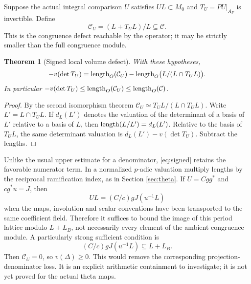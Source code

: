 \documentclass[11pt,a4paper]{article}
\newtheorem{theorem}{Theorem}[section]\newtheorem{proposition}[theorem]{Proposition}\newtheorem{lemma}[theorem]{Lemma}\newtheorem{corollary}[theorem]{Corollary}\theoremstyle{definition}\newtheorem{definition}[theorem]{Definition}\newtheorem{remark}[theorem]{Remark}\newtheorem{obligation}[theorem]{Obligation}
\begin{document}
Suppose the actual integral comparison $U$ satisfies $UL\subset M_0$ and $T_U=PU|_{A_F}$ is invertible. Define
\begin{equation}\label{eq:reach}
\mathcal C_U=(L+T_UL)/L\subseteq\mathcal C.
\end{equation}
This is the congruence defect reachable by the operator; it may be strictly smaller than the full congruence module.
\begin{theorem}[Signed local volume defect]\label{thm:signed}
With these hypotheses,
\begin{equation}\label{eq:signed}
-v(\det T_U)=\operatorname{length}_O(\mathcal C_U)-\operatorname{length}_O\bigl(L/(L\cap T_UL)\bigr).
\end{equation}
In particular $-v(\det T_U)\leq\operatorname{length}_O(\mathcal C_U)\leq\operatorname{length}_O(\mathcal C)$.
\end{theorem}
\begin{proof}By the second isomorphism theorem $\mathcal C_U\simeq T_UL/(L\cap T_UL)$. Write $L'=L\cap T_UL$. If $d_L(L')$ denotes the valuation of the determinant of a basis of $L'$ relative to a basis of $L$, then $\operatorname{length}(L/L')=d_L(L')$. Relative to the basis of $T_UL$, the same determinant valuation is $d_L(L')-v(\det T_U)$. Subtract the lengths.\end{proof}
Unlike the usual upper estimate for a denominator, \eqref{eq:signed} retains the favorable numerator term. In a normalized $p$-adic valuation multiply lengths by the reciprocal ramification index, as in Section \ref{sec:theta}. If $U=Cgg^*$ and $cg^*u=J$, then
\begin{equation}\label{eq:reachperiod}
UL=(C/c)gJ(u^{-1}L)
\end{equation}
when the maps, involution and scalar conventions have been transported to the same coefficient field. Therefore it suffices to bound the image of this period lattice modulo $L+L_B$, not necessarily every element of the ambient congruence module. A particularly strong sufficient condition is
\begin{equation}\label{eq:vanish}
(C/c)gJ(u^{-1}L)\subseteq L+L_B.
\end{equation}
Then $\mathcal C_U=0$, so $v(\Delta)\geq0$. This would remove the corresponding projection-denominator loss. It is an explicit arithmetic containment to investigate; it is not yet proved for the actual theta maps.
\end{document}
